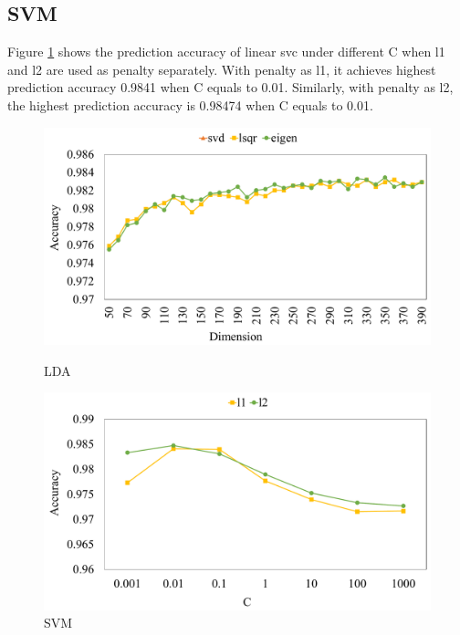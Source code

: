 \documentclass[10pt,journal,compsoc]{IEEEtran}
\begin{document}
\subsection{SVM}
\label{subsec:eva_svm}
Figure \ref{fig:svm} shows the prediction accuracy of linear svc under different C when l1 and l2 are used as penalty separately. With penalty as l1, it achieves highest prediction accuracy 0.9841 when C equals to 0.01. Similarly, with penalty as l2, the highest prediction accuracy is 0.98474 when C equals to 0.01.

\begin{figure}[!t]
  \centering
  \begin{minipage}[t]{0.225\textwidth}
    \centering
    \includegraphics[width=1\textwidth]{images/lda}
    \caption{LDA}
    \label{fig:lda}
  \end{minipage}
  \begin{minipage}[t]{0.225\textwidth}
    \centering
    \includegraphics[width=1\textwidth]{images/linsvm}
    \caption{SVM}
    \label{fig:svm}
  \end{minipage}
\end{figure}
\end{document}
